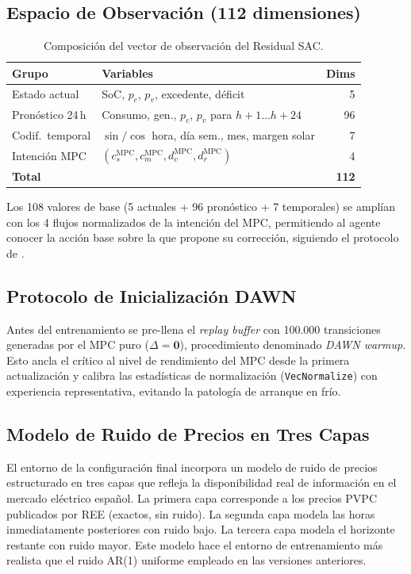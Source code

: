 \documentclass[12pt, a4paper, twoside]{report}
\begin{document}
\subsection{Espacio de Observación (112 dimensiones)}

\begin{table}[H]
\centering
\caption{Composición del vector de observación del Residual SAC.}
\label{tab:obs}
\begin{tabular}{llr}
\toprule
\textbf{Grupo} & \textbf{Variables} & \textbf{Dims} \\
\midrule
Estado actual & SoC, $p_c$, $p_v$, excedente, déficit & 5 \\
Pronóstico 24\,h & Consumo, gen., $p_c$, $p_v$ para $h{+}1\ldots h{+}24$ & 96 \\
Codif.\ temporal & $\sin/\cos$ hora, día sem., mes, margen solar & 7 \\
Intención MPC & $(c_s^{\text{MPC}}, c_m^{\text{MPC}}, d_c^{\text{MPC}}, d_r^{\text{MPC}})$ & 4 \\
\midrule
\textbf{Total} & & \textbf{112} \\
\bottomrule
\end{tabular}
\end{table}

Los 108 valores de base (5 actuales + 96 pronóstico + 7 temporales) se amplían
con los 4 flujos normalizados de la intención del MPC, permitiendo al agente
conocer la acción base sobre la que propone su corrección, siguiendo el
protocolo de \citet{Johannink2019}.

\subsection{Protocolo de Inicialización DAWN}

Antes del entrenamiento se pre-llena el \textit{replay buffer} con 100.000
transiciones generadas por el MPC puro ($\Delta = \mathbf{0}$), procedimiento
denominado \textit{DAWN warmup}. Esto ancla el crítico al nivel de rendimiento
del MPC desde la primera actualización y calibra las estadísticas de
normalización (\texttt{VecNormalize}) con experiencia representativa, evitando
la patología de arranque en frío.

\subsection{Modelo de Ruido de Precios en Tres Capas}

El entorno de la configuración final incorpora un modelo de ruido de precios
estructurado en tres capas que refleja la disponibilidad real de información en
el mercado eléctrico español. La primera capa corresponde a los precios PVPC
publicados por REE (exactos, sin ruido). La segunda capa modela las horas
inmediatamente posteriores con ruido bajo. La tercera capa modela el horizonte
restante con ruido mayor. Este modelo hace el entorno de entrenamiento más
realista que el ruido AR(1) uniforme empleado en las versiones anteriores.
\end{document}
